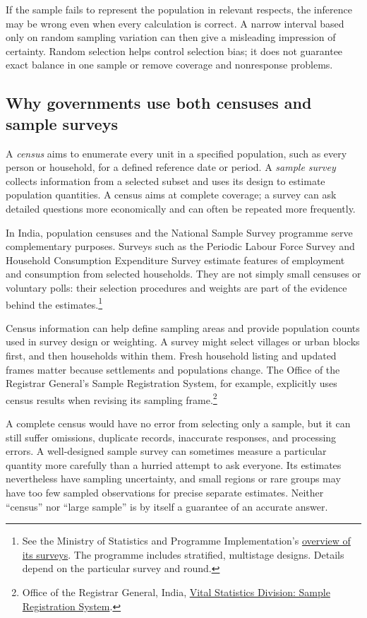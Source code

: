If the sample fails to represent the population in relevant respects,
the inference may be wrong even when every calculation is correct.
A narrow interval based only on random sampling variation can then give
a misleading impression of certainty. Random selection helps control
selection bias; it does not guarantee exact balance in one sample or
remove coverage and nonresponse problems.

\subsection{Why governments use both censuses and sample surveys}
A \emph{census} aims to enumerate every unit in a specified population,
such as every person or household, for a defined reference date or period.
A \emph{sample survey} collects information from a selected subset and
uses its design to estimate population quantities. A census aims at
complete coverage; a survey can ask detailed questions more economically
and can often be repeated more frequently.

In India, population censuses and the National Sample Survey programme
serve complementary purposes. Surveys such as the Periodic Labour Force
Survey and Household Consumption Expenditure Survey estimate features of
employment and consumption from selected households. They are not simply
small censuses or voluntary polls: their selection procedures and weights
are part of the evidence behind the estimates.\footnote{See the Ministry
of Statistics and Programme Implementation's
\href{https://www.mospi.gov.in/node/current-surveys-0}{overview of its surveys}.
The programme includes stratified, multistage designs. Details depend on
the particular survey and round.}

Census information can help define sampling areas and provide population
counts used in survey design or weighting. A survey might select villages
or urban blocks first, and then households within them. Fresh household
listing and updated frames matter because settlements and populations
change. The Office of the Registrar General's Sample Registration System,
for example, explicitly uses census results when revising its sampling
frame.\footnote{Office of the Registrar General, India,
\href{https://censusindia.gov.in/census.website/en/node/180}
{Vital Statistics Division: Sample Registration System}.}

A complete census would have no error from selecting only a sample, but
it can still suffer omissions, duplicate records, inaccurate responses,
and processing errors. A well-designed sample survey can sometimes
measure a particular quantity more carefully than a hurried attempt to
ask everyone. Its estimates nevertheless have sampling uncertainty,
and small regions or rare groups may have too few sampled observations
for precise separate estimates. Neither ``census'' nor ``large sample''
is by itself a guarantee of an accurate answer.

